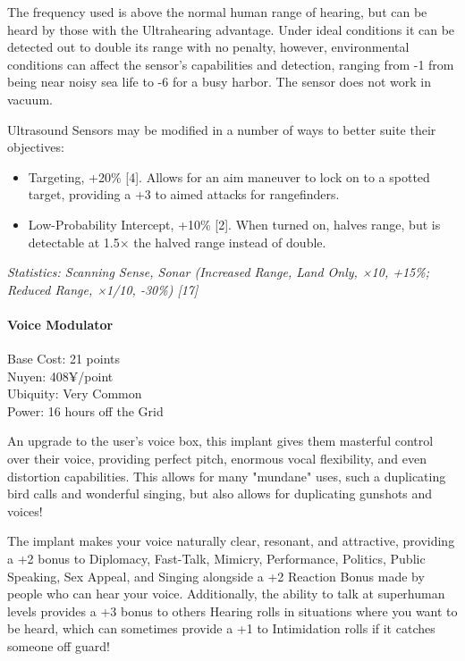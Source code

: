 \begin{multicols*}{3}
	The frequency used is above the normal human range of hearing, but can be heard by those with the Ultrahearing advantage. Under ideal conditions it can be detected out to double its range with no penalty, however, environmental conditions can affect the sensor's capabilities and detection, ranging from -1 from being near noisy sea life to -6 for a busy harbor. The sensor does not work in vacuum.
	
	Ultrasound Sensors may be modified in a number of ways to better suite their objectives:
	\begin{itemize}
		\item Targeting, +20\% [4]. Allows for an aim maneuver to lock on to a spotted target, providing a +3 to aimed attacks for rangefinders.
		\item Low-Probability Intercept, +10\% [2]. When turned on, halves range, but is detectable at 1.5× the halved range instead of double.
	\end{itemize}
	
	\textit{\textcolor{OliveGreen}{Statistics: Scanning Sense, Sonar (Increased Range, Land Only, ×10, +15\%; Reduced Range, ×1/10, -30\%) [17]}}
	
	\paragraph{Voice Modulator}
	\begin{flushright}
		Base Cost: 21 points\\
		Nuyen: 408¥/point\\
		Ubiquity: Very Common\\
		Power: 16 hours off the Grid\\
	\end{flushright}

	An upgrade to the user's voice box, this implant gives them masterful control over their voice, providing perfect pitch, enormous vocal flexibility, and even distortion capabilities. This allows for many "mundane" uses, such a duplicating bird calls and wonderful singing, but also allows for duplicating gunshots and voices!
	
	The implant makes your voice naturally clear, resonant, and attractive, providing a +2 bonus to Diplomacy, Fast-Talk, Mimicry, Performance, Politics, Public Speaking, Sex Appeal, and Singing alongside a +2 Reaction Bonus made by people who can hear your voice. Additionally, the ability to talk at superhuman levels provides a +3 bonus to others Hearing rolls in situations where you want to be heard, which can sometimes provide a +1 to Intimidation rolls if it catches someone off guard!
	

\end{multicols*}
